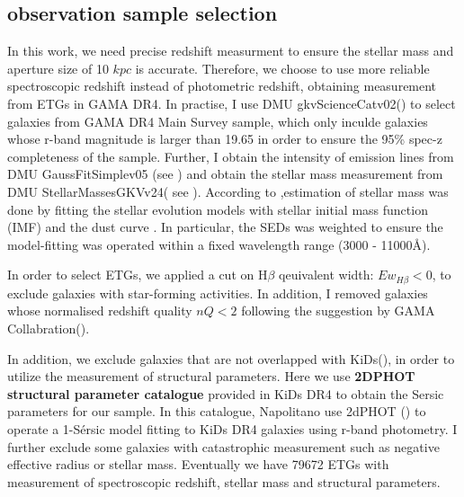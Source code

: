 \documentclass[fleqn,usenatbib]{mnras}
\begin{document}
\subsection{observation sample selection}
\par In this work, we need precise redshift measurment to ensure the stellar mass and aperture size of 10 $kpc$ is accurate. Therefore, we choose to use more reliable spectroscopic redshift instead of photometric redshift, obtaining measurement from ETGs in GAMA DR4. 
In practise, I  use DMU gkvScienceCatv02(\cite{bellstedt_galaxy_2020}) to select galaxies from GAMA DR4 Main Survey sample, which only inculde galaxies whose r-band magnitude is larger than 19.65 in order to ensure the 95\% spec-z completeness of the sample. Further, I obtain the intensity of emission lines from DMU GaussFitSimplev05 (see \cite{Gordon_GAMAspecline_2017}) and obtain the stellar mass measurement from DMU StellarMassesGKVv24( see \cite{GAMAmain}). According to \cite{Taylor2011},estimation of stellar mass was done by fitting the \cite{bruzual_2003} stellar evolution models with \cite{chabrier2003} stellar initial mass function (IMF) and the \cite{calzetti2000} dust curve . In particular, the SEDs was weighted to ensure the model-fitting was operated within a fixed wavelength range (3000 - 11000\r{A}). 
\par In order to select ETGs, we applied a cut on H$\beta$ qeuivalent width: $Ew_{H\beta} < 0 $, to exclude galaxies with star-forming activities. In addition, I removed galaxies whose normalised redshift quality $nQ < 2$ following the suggestion by GAMA Collabration(\citep{GAMAmain}).
\par In addition, we exclude galaxies that are not overlapped with KiDs(\cite{kuijken_fourth_2019}), in order to utilize the measurement of structural parameters. Here we use  \textbf{2DPHOT structural parameter catalogue} provided in KiDs DR4 to obtain the Sersic parameters for our sample. In this catalogue, Napolitano use 2dPHOT (\cite{LaBarbera_2dphot_2008}) to operate a 1-S\'{e}rsic model fitting to KiDs DR4 galaxies using r-band photometry. I further exclude some galaxies with catastrophic measurement such as negative effective radius or stellar mass. Eventually we have 79672 ETGs with measurement of spectroscopic redshift, stellar mass and structural parameters.  
\end{document}
